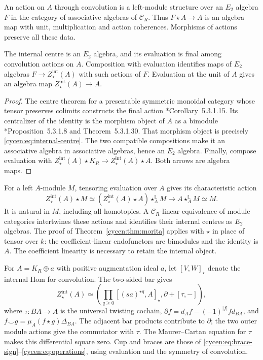 An action on $A$ through convolution is a left-module
structure over an $E_2$ algebra $F$ in the category of
associative algebras of $\mathscr C_R$. Thus
$F\star A\to A$ is an algebra map with unit, multiplication
and action coherences. Morphisms of actions preserve all
these data.

\begin{theorem}\label{cycen:thm:convolution}
The internal centre is an $E_2$ algebra, and its evaluation
is final among convolution actions on $A$. Composition with
evaluation identifies maps of $E_2$ algebras
$F\to Z_\star^{\mathrm{int}}(A)$ with such actions of $F$.
Evaluation at the unit of $A$ gives an algebra map
$Z_\star^{\mathrm{int}}(A)\to A$.
\end{theorem}
\begin{proof}
The centre theorem for a presentable symmetric monoidal
category whose tensor preserves colimits constructs the final
action \cite{LurieHA}*{Corollary~5.3.1.15}. Its centralizer
of the identity is the morphism object of $A$ as a bimodule
\cite{LurieHA}*{Proposition~5.3.1.8 and Theorem~5.3.1.30}.
That morphism object is precisely
\eqref{cycen:eq:internal-centre}. The two compatible
compositions make it an associative algebra in associative
algebras, hence an $E_2$ algebra. Finally, compose evaluation
with $Z_\star^{\mathrm{int}}(A)\star K_R\to
Z_\star^{\mathrm{int}}(A)\star A$. Both arrows are algebra maps.
\end{proof}

For a left $A$-module $M$, tensoring evaluation over $A$
gives its characteristic action
\begin{equation}\label{cycen:eq:module-action}
 Z_\star^{\mathrm{int}}(A)\star M
 \simeq (Z_\star^{\mathrm{int}}(A)\star A)
                \star_A^{\mathbb L}M
 \longrightarrow A\star_A^{\mathbb L}M\simeq M.
\end{equation}
It is natural in $M$, including all homotopies. A
$\mathscr C_R$-linear equivalence of module categories
intertwines these actions and identifies their internal
centres as $E_2$ algebras. The proof of
Theorem~\ref{cycen:thm:morita} applies with $\star$ in place
of tensor over $k$: the coefficient-linear endofunctors are
bimodules and the identity is $A$. The coefficient linearity
is necessary to retain the internal object.

For $A=K_R\oplus a$ with positive augmentation ideal $a$,
let $[V,W]_\star$ denote the internal Hom for convolution.
The two-sided bar gives
\begin{equation}\label{cycen:eq:internal-bar}
 Z_\star^{\mathrm{int}}(A)
 \simeq
 \left(\prod_{q\geq0}[(sa)^{\star q},A]_\star,
                             \partial+[\tau,-]\right),
\end{equation}
where $\tau:BA\to A$ is the universal twisting cochain,
$\partial f=d_Af-(-1)^{|f|}fd_{BA}$, and
$f\smile g=\mu_A(f\star g)\Delta_{BA}$.
The adjacent bar products contribute to $\partial$;
the two outer module actions give the commutator with $\tau$.
The Maurer--Cartan equation for $\tau$ makes this differential
square zero. Cup and braces are those of
\eqref{cycen:eq:brace-sign}--\eqref{cycen:eq:operations},
using evaluation and the symmetry of convolution.

